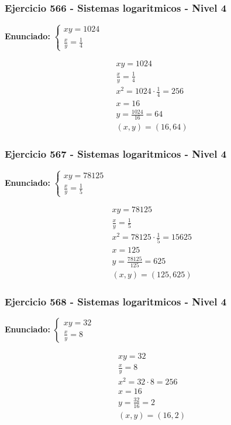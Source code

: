 \documentclass[12pt,a4paper]{article}
\begin{document}
\subsubsection*{Ejercicio 566 - Sistemas logaritmicos - Nivel 4}
\textbf{Enunciado:} \(\begin{cases} xy=1024\\ \frac{x}{y}=\frac{1}{4}\end{cases}\)

\[
\begin{aligned}
xy=1024\\
\frac{x}{y}=\frac{1}{4}\\
x^2=1024\cdot \frac{1}{4}=256\\
x=16\\
y=\frac{1024}{16}=64\\
\boxed{(x,y)=(16,64)}
\end{aligned}
\]


\subsubsection*{Ejercicio 567 - Sistemas logaritmicos - Nivel 4}
\textbf{Enunciado:} \(\begin{cases} xy=78125\\ \frac{x}{y}=\frac{1}{5}\end{cases}\)

\[
\begin{aligned}
xy=78125\\
\frac{x}{y}=\frac{1}{5}\\
x^2=78125\cdot \frac{1}{5}=15625\\
x=125\\
y=\frac{78125}{125}=625\\
\boxed{(x,y)=(125,625)}
\end{aligned}
\]


\subsubsection*{Ejercicio 568 - Sistemas logaritmicos - Nivel 4}
\textbf{Enunciado:} \(\begin{cases} xy=32\\ \frac{x}{y}=8\end{cases}\)

\[
\begin{aligned}
xy=32\\
\frac{x}{y}=8\\
x^2=32\cdot 8=256\\
x=16\\
y=\frac{32}{16}=2\\
\boxed{(x,y)=(16,2)}
\end{aligned}
\]
\end{document}

